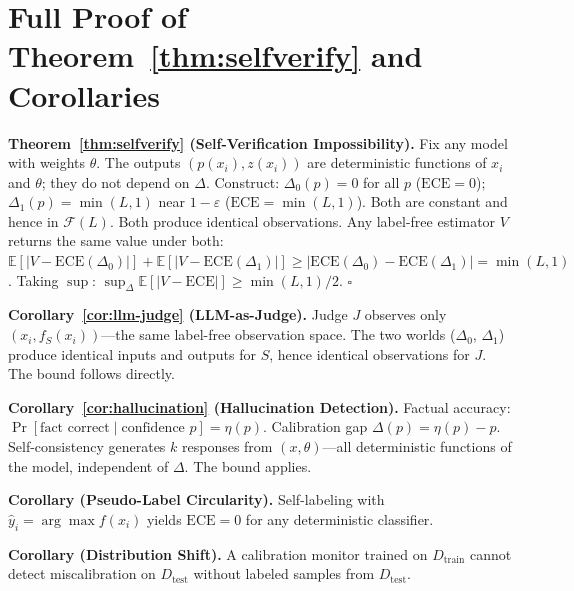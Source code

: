 \documentclass{article}
\newcommand{\ECE}{\mathrm{ECE}}
\newcommand{\cF}{\mathcal{F}}
\newcommand{\Lip}{L}
\newcommand{\errrate}{\varepsilon}
\newcommand{\calmapraw}{\eta}
\newcommand{\calmap}{\Delta}
\providecommand{\E}{}
\renewcommand{\E}{\mathbb{E}}
\theoremstyle{definition}
\begin{document}



\newpage
\appendix

\section{Full Proof of Theorem~\ref{thm:selfverify} and Corollaries}
\label{app:selfverify-proof}

\textbf{Theorem~\ref{thm:selfverify} (Self-Verification Impossibility).}
Fix any model with weights $\theta$. The outputs $(p(x_i), z(x_i))$ are deterministic functions of $x_i$ and $\theta$; they do not depend on $\calmap$. Construct:
$\calmap_0(p) = 0$ for all $p$ ($\ECE = 0$); $\calmap_1(p) = \min(\Lip, 1)$ near $1-\errrate$ ($\ECE = \min(\Lip,1)$). Both are constant and hence in $\cF(\Lip)$. Both produce identical observations. Any label-free estimator $V$ returns the same value under both:
$\E[|V - \ECE(\calmap_0)|] + \E[|V - \ECE(\calmap_1)|] \geq |\ECE(\calmap_0) - \ECE(\calmap_1)| = \min(\Lip,1)$.
Taking $\sup$: $\sup_\calmap \E[|V - \ECE|] \geq \min(\Lip,1)/2$. $\square$

\textbf{Corollary~\ref{cor:llm-judge} (LLM-as-Judge).} Judge $J$ observes only $(x_i, f_S(x_i))$---the same label-free observation space. The two worlds ($\calmap_0$, $\calmap_1$) produce identical inputs and outputs for $S$, hence identical observations for $J$. The bound follows directly.

\textbf{Corollary~\ref{cor:hallucination} (Hallucination Detection).} Factual accuracy: $\Pr[\text{fact correct} \mid \text{confidence } p] = \calmapraw(p)$. Calibration gap $\calmap(p) = \calmapraw(p) - p$. Self-consistency generates $k$ responses from $(x, \theta)$---all deterministic functions of the model, independent of $\calmap$. The bound applies.

\textbf{Corollary (Pseudo-Label Circularity).} Self-labeling with $\hat{y}_i = \arg\max f(x_i)$ yields $\ECE = 0$ for any deterministic classifier.

\textbf{Corollary (Distribution Shift).} A calibration monitor trained on $D_{\mathrm{train}}$ cannot detect miscalibration on $D_{\mathrm{test}}$ without labeled samples from $D_{\mathrm{test}}$.

\end{document}
